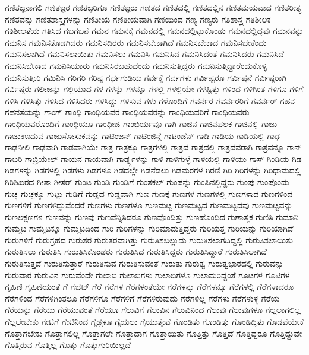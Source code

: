 {ಗಣಿತಜ್ಞನಾಗಲಿ
ಗಣಿತಜ್ಞರ
ಗಣಿತಜ್ಞರಿಗೂ
ಗಣಿತಜ್ಞರು
ಗಣಿತದ
ಗಣಿತದಲ್ಲಿ
ಗಣಿತದಲ್ಲಿನ
ಗಣಿತಮಯವಾದ
ಗಣಿತರೀತ್ಯ
ಗಣಿತವನ್ನು
ಗಣಿತಶಾಸ್ತ್ರಗಳನ್ನು
ಗಣಿತೀಯ
ಗಣಿತೀಯವಾಗಿ
ಗಣಿಯಿಂದ
ಗಣ್ಯ
ಗಣ್ಯರು
ಗತಿಶಾಸ್ತ್ರ
ಗತಿಶೀಲಕ
ಗತಿಶೀಲತೆಯ
ಗತಿಸಿದ
ಗಬಗಬನೆ
ಗಮನ
ಗಮನಕ್ಕೆ
ಗಮನದಲ್ಲಿ
ಗಮನದಲ್ಲಿಟ್ಟುಕೊಂಡು
ಗಮನದಲ್ಲಿದ್ದವು
ಗಮನವನ್ನು
ಗಮನಿಸ
ಗಮನಿಸತೊಡಗಿದರು
ಗಮನಿಸದಿರರು
ಗಮನಿಸಬೇಕಾಗಿದೆ
ಗಮನಿಸಬೇಕಾದ
ಗಮನಿಸಬೇಕೆಂದು
ಗಮನಿಸಲಾಗಿದೆ
ಗಮನಿಸಲಾಯಿತು
ಗಮನಿಸಲು
ಗಮನಿಸಿ
ಗಮನಿಸಿದ
ಗಮನಿಸಿದಂತೆ
ಗಮನಿಸಿದರು
ಗಮನಿಸಿದೆ
ಗಮನಿಸಿಬೇಕಾದ
ಗಮನಿಸಿಯಾರು
ಗಮನಿಸಿರಬಹುದೆಂದು
ಗಮನಿಸುತ್ತಿದ್ದರು
ಗಮನಿಸುತ್ತಿದ್ದಾರೆಂದುಕೊಳ್ಳಿ
ಗಮನಿಸುತ್ತೀರಿ
ಗಮಿನಿಸಿ
ಗರಿಗರಿ
ಗರಿಷ್ಠ
ಗರ್ಭಗುಡಿಯ
ಗರ್ವಕ್ಕೆ
ಗರ್ವಗಳು
ಗರ್ವಿಷ್ಟರೂ
ಗರ್ವಿಷ್ಠನೆ
ಗರ್ವಿಷ್ಠರಾಗಿ
ಗರ್ವಿಷ್ಠರು
ಗಲೀಜನ್ನು
ಗಲ್ಲಿಯಾದ
ಗಳ
ಗಳನ್ನು
ಗಳನ್ನೂ
ಗಳಲ್ಲಿ
ಗಳಲ್ಲಿಯೇ
ಗಳಷ್ಟಿತ್ತು
ಗಳಿಂದ
ಗಳಿಗಿಂತ
ಗಳಿಗೂ
ಗಳಿಗೆ
ಗಳಿಸಿ
ಗಳಿಸಿತ್ತು
ಗಳಿಸಿದ
ಗಳಿಸಿದರು
ಗಳಿಸಿದ್ದು
ಗಳಿಸುವ
ಗಳು
ಗಳೊಂದಿಗೆ
ಗವರ್ನರ
ಗವರ್ನರರಿಗೆ
ಗವರ್ನರ್
ಗಹನ
ಗಹನತೆಯನ್ನು
ಗಾಂಗ್
ಗಾಂಧಿ
ಗಾಂಧಿಯವರ
ಗಾಂಧಿಯವರನ್ನು
ಗಾಂಧಿಯವರಿಗೆ
ಗಾಂಧಿಯವರು
ಗಾಂಧಿಯವರೊಂದಿಗೆ
ಗಾಂಧಿಯೂ
ಗಾಂಧೀಜಿ
ಗಾಂಭಿರ್ಯವೂ
ಗಾಗಿ
ಗಾಜಿನ
ಗಾಜಿನಫಲಕ
ಗಾಜಿನಲ್ಲಿ
ಗಾಜು
ಗಾಜುಊದುವ
ಗಾಜುಸೋಸುಕವನ್ನು
ಗಾಟಿಂಜನ್
ಗಾಟಿಂಜಿನ್ಗೆ
ಗಾಟಿಂಜೆನ್
ಗಾಡಿ
ಗಾಡಿಯ
ಗಾಡಿಯಲ್ಲಿ
ಗಾಢ
ಗಾಢನೀಲಿ
ಗಾಢವಾಗಿ
ಗಾಢವಾಗಿಯೇ
ಗಾತ್ರ
ಗಾತ್ರಕ್ಕೂ
ಗಾತ್ರಗಳಲ್ಲಿ
ಗಾತ್ರದ
ಗಾತ್ರದಲ್ಲಿ
ಗಾತ್ರದವರಾಗಿ
ಗಾತ್ರವನ್ನೂ
ಗಾನ್
ಗಾಬರಿ
ಗಾಬ್ರಿಯೇಲ್
ಗಾಯನ
ಗಾಯವಾಗಿ
ಗಾರ್ಡ್ನ್ಗಳನ್ನು
ಗಾಳಿ
ಗಾಳಿಗುಳ್ಳೆ
ಗಾಳಿಯಲ್ಲಿ
ಗಾಳಿಯು
ಗಾಸ್
ಗಿಂಡಿಯ
ಗಿಡ
ಗಿಡಗಳನ್ನು
ಗಿಡಗಳಲ್ಲಿ
ಗಿಡಗಳು
ಗಿಡಗಳೂ
ಗಿಡದಲ್ಲೇ
ಗಿಡನೆಡಲು
ಗಿಡಮರಗಳ
ಗಿರಣಿ
ಗಿರಿ
ಗಿರಿಗಳನ್ನು
ಗಿರಿಧಾಮದಲ್ಲಿ
ಗಿರಿಶಿಖರದ
ಗೀತಾ
ಗೀಸರ್
ಗುಂಟ
ಗುಂಡಿ
ಗುಂಡಿಗೆ
ಗುಂತಕಲ್
ಗುಂಪನ್ನು
ಗುಂಪಿನಲ್ಲಿದ್ದರು
ಗುಂಪು
ಗುಂಪೊಂದು
ಗುಚ್ಛ
ಗುಚ್ಛಕ್ಕೂ
ಗುಟ್ಟು
ಗುಡಿಗೆ
ಗುಡ್ಡದ
ಗುಡ್ಡವಾಗಿ
ಗುಣ
ಗುಣಕ್ಕೆ
ಗುಣಗಳ
ಗುಣಗಳಲ್ಲಿ
ಗುಣಗಳಾದ
ಗುಣಗಳಿಂದ
ಗುಣಗಳಿಗೆ
ಗುಣಗಳಿದ್ದುವೆಂದರೆ
ಗುಣಗಳು
ಗುಣಗಳೂ
ಗುಣಮಟ್ಟ
ಗುಣಮಟ್ಟದ
ಗುಣಮಟ್ಟದವು
ಗುಣಮಟ್ಟವನ್ನು
ಗುಣಲಕ್ಷಣಗಳ
ಗುಣವನ್ನು
ಗುಣವು
ಗುಣವೆನ್ನಿಸಿದರೂ
ಗುಣವೊಂದಿತ್ತು
ಗುಣಹೊಂದಿದ
ಗುಣಾತ್ಮಕ
ಗುಣಿಸಿ
ಗುಮಾನಿ
ಗುಮ್ಮಟ
ಗುಮ್ಮಟಕ್ಕೂ
ಗುಮ್ಮಟದಿಂದ
ಗುರಿ
ಗುರಿಗಳನ್ನು
ಗುರಿಮಾಡುತ್ತಿದ್ದರು
ಗುರಿಯತ್ತ
ಗುರಿಯನ್ನು
ಗುರಿಯಾಗಿದೆ
ಗುರುಗಳಿಗೆ
ಗುರುಗ್ರಹದ
ಗುರುತರ
ಗುರುತರವಾಗಿತ್ತು
ಗುರುತಿಸಬಲ್ಲುದು
ಗುರುತಿಸಲಾಗದಿದ್ದಲ್ಲಿ
ಗುರುತಿಸಲಾಯಿತು
ಗುರುತಿಸಲು
ಗುರುತಿಸಿ
ಗುರುತಿಸಿಕೊಂಡರು
ಗುರುತಿಸಿದ
ಗುರುತಿಸಿದ್ದರು
ಗುರುತಿಸಿದ್ದಾರೆ
ಗುರುತಿಸಿಲಾಗಿದೆ
ಗುರುತಿಸುತ್ತದೆ
ಗುರುತಿಸುತ್ತಾರೆ
ಗುರುತಿಸುವ
ಗುರುತಿಸುವಂತೆ
ಗುರುತು
ಗುರುತ್ವ
ಗುರುತ್ವಭಾರದಲ್ಲಿ
ಗುರುವನ್ನು
ಗುರುವಾರ
ಗುರುವಿನ
ಗುರುವೆಂದೇ
ಗುಲಾಬಿ
ಗುಲಾಬಿಗಳು
ಗುಲಾಬಿಗಳೂ
ಗುಲಾಮರಿದ್ದಂತೆ
ಗೂಟಗಳ
ಗೂಟಿಗಳ
ಗೃಹಿಣಿ
ಗೃಹಿಣಿಯಂತೆ
ಗೆ
ಗೆಜೆಟ್
ಗೆರೆ
ಗೆರೆಗಳ
ಗೆರೆಗಳಂತೆಯೇ
ಗೆರೆಗಳನ್ನು
ಗೆರೆಗಳನ್ನೂ
ಗೆರೆಗಳಲ್ಲಿ
ಗೆರೆಗಳಾದರೂ
ಗೆರೆಗಳಿಂದ
ಗೆರೆಗಳಿಗಿಂತಲೂ
ಗೆರೆಗಳಿಗೂ
ಗೆರೆಗಳಿಗೆ
ಗೆರೆಗಳಿರುವುದು
ಗೆರೆಗಳಿಲ್ಲ
ಗೆರೆಗಳು
ಗೆರೆಗಳುಳ್ಳ
ಗೆರೆಯ
ಗೆರೆಯನ್ನು
ಗೆರೆಯು
ಗೆರೆಯುವಂತೆ
ಗೆರೆಯೂ
ಗೆಲುವಿಗೆ
ಗೆಲುವಿನ
ಗೆಲುವಿನಿಂದ
ಗೆಲುವು
ಗೆಲುವುಗಳೂ
ಗೆಲ್ಲಲಾಗಲಿಲ್ಲ
ಗೆಲ್ಲಲೇಬೇಕು
ಗೇಟಿಗೆ
ಗೇಟಿನಿಂದ
ಗೈಡ್ಗಳೂ
ಗೈಯಲು
ಗೈಯುತ್ತೇವೆ
ಗೊಂಡಿತು
ಗೊಂಡಿತ್ತು
ಗೊಂಡಿದ್ದಿತು
ಗೊಡವೆಯೇಕೆ
ಗೊತ್ತಾಗಬೇಕು
ಗೊತ್ತಾಗಲಿಲ್ಲ
ಗೊತ್ತಾಗಲೇ
ಗೊತ್ತಾದಾಗ
ಗೊತ್ತಾಯಿತು
ಗೊತ್ತಿತ್ತು
ಗೊತ್ತಿದೆ
ಗೊತ್ತಿದ್ದರೂ
ಗೊತ್ತಿದ್ದುವೇ
ಗೊತ್ತಿರುವ
ಗೊತ್ತಿಲ್ಲ
ಗೊತ್ತು
ಗೊತ್ತುಗುರಿಯಿಲ್ಲದೆ
}
